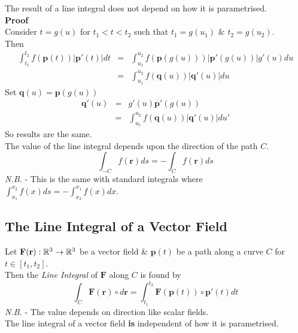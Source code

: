 \documentclass[11pt,a4paper]{article}
\begin{document}
The result of a line integral does not depend on how it is parametrised.\\
\textbf{Proof}\\
Consider $t=g(u)$ for $t_1<t<t_2$ such that $t_1=g(u_1)$ \& $t_2=g(u_2)$.\\
Then
\[\begin{array}{rcl}
\displaystyle{\int_{t_1}^{t_2}f(\textbf{p}(t))|\textbf{p}'(t)|dt}&=&\displaystyle{\int_{u_1}^{u_2}f(\textbf{p}(g(u)))|\textbf{p}'(g(u))|g'(u)du}\\
&=&\displaystyle{\int_{u_1}^{u_2}f(\textbf{q}(u))|\textbf{q}'(u)|du}
\end{array}\]
Set $\textbf{q}(u)=\textbf{p}(g(u))$
\[\begin{array}{rcl}
\textbf{q}'(u)&=&g'(u)\textbf{p}'(g(u))\\
&=&\displaystyle{\int_{u_1}^{u_2}f(\textbf{q}(u))|\textbf{q}'(u)|du'}
\end{array}\]
So results are the same.\\

The value of the line integral depends upon the direction of the path $C$.
$$\int_{-C}f(\textbf{r})ds=-\int_{C}f(\textbf{r})ds$$
\textit{N.B.} - This is the same with standard integrals where $\displaystyle{\int_{x_1}^{x_2}f(x)ds=-\int_{x_2}^{x_1}f(x)dx}$.\\

\subsection{The Line Integral of a Vector Field}

Let $\textbf{F}(\textbf{r}):\mathbb{R}^3\to\mathbb{R}^3$ be a vector field \& $\textbf{p}(t)$ be a path along a curve $C$ for $t\in[t_1,t_2]$.\\
Then the \textit{Line Integral} of $\textbf{F}$ along $C$ is found by
$$\int_C\textbf{F}(\textbf{r})\circ d\textbf{r}=\int_{t_1}^{t_2}\textbf{F}(\textbf{p}(t))\circ\textbf{p}'(t)dt$$
\textit{N.B.} - The value depends on direction like scalar fields.\\

The line integral of a vector field \textbf{is} independent of how it is parametrised.\\
\end{document}
